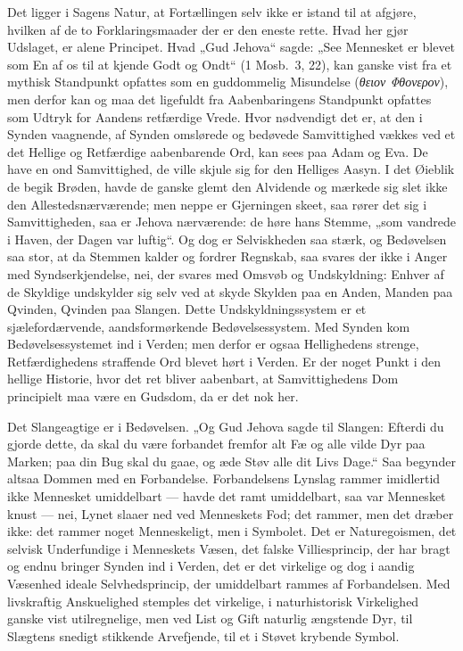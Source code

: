 \documentclass[12pt]{book}
\begin{document}
Det ligger i Sagens Natur, at Fortællingen selv ikke er istand til
at afgjøre, hvilken af de to Forklaringsmaader der er den eneste
rette. Hvad her gjør Udslaget, er alene Principet. Hvad „Gud Jehova“
sagde: „See Mennesket er blevet som En af os til at kjende Godt og
Ondt“ (1 Mosb.\ 3, 22), kan ganske vist fra et mythisk Standpunkt
opfattes som en guddommelig Misundelse
(\textit{θειον Φθονερον}), men derfor kan og maa det ligefuldt fra
Aabenbaringens Standpunkt opfattes som Udtryk for Aandens
retfærdige Vrede. Hvor nødvendigt det er, at den i Synden vaagnende,
af Synden omslørede og bedøvede
Samvittighed vækkes ved et det Hellige og Retfærdige aabenbarende
Ord, kan sees paa Adam og Eva. De have en ond Samvittighed, de ville
skjule sig for den Helliges Aasyn. I det Øieblik de begik Brøden,
havde de ganske glemt den Alvidende og mærkede sig slet ikke den
Allestedsnærværende; men neppe er Gjerningen skeet, saa rører det
sig i Samvittigheden, saa er Jehova nærværende: de høre hans Stemme,
„som vandrede i Haven, der Dagen var luftig“. Og dog er Selviskheden
saa stærk, og Bedøvelsen saa stor, at da Stemmen kalder og fordrer
Regnskab, saa svares der ikke i Anger med Syndserkjendelse, nei, der
svares med Omsvøb og Undskyldning: Enhver af de Skyldige undskylder
sig selv ved at skyde Skylden paa en Anden, Manden paa Qvinden,
Qvinden paa Slangen. Dette Undskyldningssystem er et
sjælefordærvende, aandsformørkende Bedøvelsessystem. Med Synden kom
Bedøvelsessystemet ind i Verden; men derfor er ogsaa Hellighedens
strenge, Retfærdighedens straffende Ord blevet hørt i Verden. Er der
noget Punkt i den hellige Historie, hvor det ret bliver aabenbart,
at Samvittighedens Dom principielt maa være en Gudsdom, da er det
nok her.

Det Slangeagtige er i Bedøvelsen. „Og Gud Jehova sagde til Slangen:
Efterdi du gjorde dette, da skal du være forbandet fremfor alt Fæ og
alle vilde Dyr paa Marken; paa din Bug skal du gaae, og æde Støv
alle dit Livs Dage.“ Saa begynder altsaa Dommen med en Forbandelse.
Forbandelsens Lynslag rammer imidlertid ikke Mennesket umiddelbart
--- havde det ramt umiddelbart, saa var Mennesket knust --- nei,
Lynet slaaer ned ved Menneskets Fod; det rammer, men det dræber
ikke: det rammer noget Menneskeligt, men i Symbolet. Det er
Naturegoismen, det selvisk Underfundige i Menneskets Væsen, det
falske Villiesprincip, der har bragt og endnu bringer Synden ind i
Verden, det er det virkelige og dog i aandig Væsenhed
ideale Selvhedsprincip, der umiddelbart rammes af Forbandelsen. Med
livskraftig Anskuelighed stemples det virkelige, i naturhistorisk
Virkelighed ganske vist utilregnelige, men ved List og Gift naturlig
ængstende Dyr, til Slægtens snedigt stikkende Arvefjende, til et i
Støvet krybende Symbol.
\end{document}
